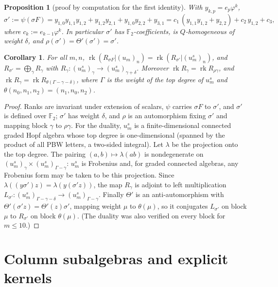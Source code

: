 \documentclass[11pt]{amsart}
\newtheorem{proposition}[theorem]{Proposition}
\newtheorem{corollary}[theorem]{Corollary}
\theoremstyle{definition}
\newcommand{\F}{\mathbb{F}}
\newcommand{\rk}{\operatorname{rk}}
\begin{document}
\begin{proposition}[proof by computation for the first identity]\label{prop:sigmaprime}
With $y_{k,p}=e_p\varphi^k$,
\[
  \sigma':=\psi(\sigma F)=y_{1,0}y_{1,1}y_{1,2}+y_{1,2}y_{2,1}+y_{1,0}y_{2,2}+y_{3,1}
  =c_1\,(y_{1,1}y_{1,2}+y_{2,2})+c_2\,y_{1,2}+c_3,
\]
where $c_k:=e_{k-1}\varphi^k$. In particular $\sigma'$ has $\F_2$-coefficients, is $Q$-homogeneous of weight $\delta$,
and $\rho(\sigma')=\Theta'(\sigma')=\sigma'$.
\end{proposition}

\begin{corollary}\label{cor:blocks}
For all $m,n$, $\rk(R_{\sigma F}|(u_m)_n)=\rk(R_{\sigma'}|(u^s_m)_n)$, and $R_{\sigma'}=\bigoplus_\gamma R_\gamma$ with
$R_\gamma:(u^s_m)_\gamma\to(u^s_m)_{\gamma+\delta}$. Moreover $\rk R_\gamma=\rk R_{\rho\gamma}$, and
$\rk R_\gamma=\rk R_{\theta(\Gamma-\gamma-\delta)}$, where $\Gamma$ is the weight of the top degree of $u^s_m$ and
$\theta(n_0,n_1,n_2)=(n_1,n_0,n_2)$.
\end{corollary}

\begin{proof}
Ranks are invariant under extension of scalars, $\psi$ carries $\sigma F$ to $\sigma'$, and $\sigma'$ is defined over $\F_2$;
$\sigma'$ has weight $\delta$, and $\rho$ is an automorphism fixing $\sigma'$ and mapping block $\gamma$ to $\rho\gamma$.
For the duality, $u^s_m$ is a finite-dimensional connected graded Hopf algebra whose top degree is one-dimensional
(spanned by the product of all PBW letters, a two-sided integral). Let $\lambda$ be the projection onto the top
degree. The pairing $(a,b)\mapsto\lambda(ab)$ is nondegenerate on $(u^s_m)_\gamma\times(u^s_m)_{\Gamma-\gamma}$:
$u^s_m$ is Frobenius \cite{LarsonSweedler} and, for graded connected algebras, any Frobenius form may be taken to be
this projection. Since $\lambda((y\sigma')z)=\lambda(y(\sigma'z))$, the map $R_\gamma$ is adjoint to left multiplication
$L_{\sigma'}:(u^s_m)_{\Gamma-\gamma-\delta}\to(u^s_m)_{\Gamma-\gamma}$. Finally $\Theta'$ is an anti-automorphism with
$\Theta'(\sigma'z)=\Theta'(z)\sigma'$, mapping weight $\mu$ to $\theta(\mu)$, so it conjugates $L_{\sigma'}$ on block $\mu$
to $R_{\sigma'}$ on block $\theta(\mu)$. (The duality was also verified on every block for $m\le10$.)
\end{proof}

\section{Column subalgebras and explicit kernels}\label{sec:kernel}
\end{document}
